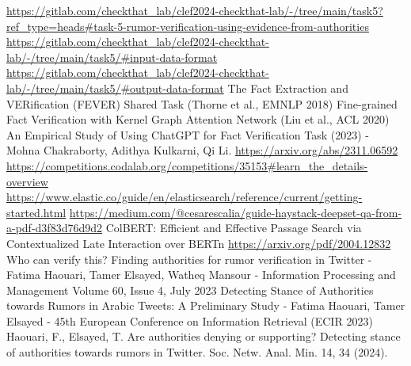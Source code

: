 \documentclass[conference]{IEEEtran}
\begin{document}
\begin{thebibliography}{00}
 \url{https://gitlab.com/checkthat_lab/clef2024-checkthat-lab/-/tree/main/task5?ref_type=heads#task-5-rumor-verification-using-evidence-from-authorities}
 \url{https://gitlab.com/checkthat_lab/clef2024-checkthat-lab/-/tree/main/task5/#input-data-format}
 \url{https://gitlab.com/checkthat_lab/clef2024-checkthat-lab/-/tree/main/task5/#output-data-format}
 The Fact Extraction and VERification (FEVER) Shared Task (Thorne et al., EMNLP 2018)
 Fine-grained Fact Verification with Kernel Graph Attention Network (Liu et al., ACL 2020)
 An Empirical Study of Using ChatGPT for Fact Verification Task (2023) - Mohna Chakraborty, Adithya Kulkarni, Qi Li. \url{https://arxiv.org/abs/2311.06592}
 \url{https://competitions.codalab.org/competitions/35153#learn_the_details-overview}
 \url{https://www.elastic.co/guide/en/elasticsearch/reference/current/getting-started.html}
 \url{https://medium.com/@cesarescalia/guide-haystack-deepset-qa-from-a-pdf-d3f83d76d9d2}
 ColBERT: Efficient and Effective Passage Search via Contextualized Late Interaction over BERTn \url{https://arxiv.org/pdf/2004.12832}
 Who can verify this? Finding authorities for rumor verification in Twitter - Fatima Haouari, Tamer Elsayed, Watheq Mansour - Information Processing and Management Volume 60, Issue 4, July 2023
 Detecting Stance of Authorities towards Rumors in Arabic Tweets: A Preliminary Study - Fatima Haouari, Tamer Elsayed - 45th European Conference on Information Retrieval (ECIR 2023)
 Haouari, F., Elsayed, T. Are authorities denying or supporting? Detecting stance of authorities towards rumors in Twitter. Soc. Netw. Anal. Min. 14, 34 (2024).


\end{thebibliography}
\end{document}
